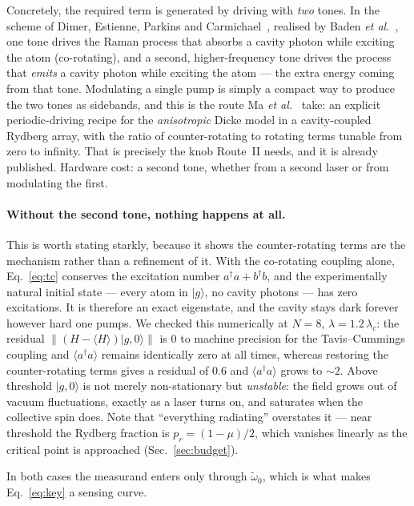 \documentclass[11pt,a4paper]{article}
\newcommand{\dg}{^{\dagger}}
\newcommand{\wt}{\tilde{\omega}_{0}}
\newcommand{\lc}{\lambda_{c}}
\newcommand{\ket}[1]{\lvert #1 \rangle}
\newcommand{\avg}[1]{\langle #1 \rangle}
\begin{document}
Concretely, the required term is generated by driving with \emph{two} tones. In the scheme of
Dimer, Estienne, Parkins and Carmichael~\cite{Dimer2007}, realised by Baden \emph{et
al.}~\cite{Baden2014}, one tone drives the Raman process that absorbs a cavity photon while
exciting the atom (co-rotating), and a second, higher-frequency tone drives the process that
\emph{emits} a cavity photon while exciting the atom --- the extra energy coming from that
tone. Modulating a single pump is simply a compact way to produce the two tones as sidebands,
and this is the route Ma \emph{et al.}~\cite{Anisotropic2025} take: an explicit
periodic-driving recipe for the \emph{anisotropic} Dicke model in a cavity-coupled Rydberg
array, with the ratio of counter-rotating to rotating terms tunable from zero to infinity.
That is precisely the knob Route~II needs, and it is already published. Hardware cost: a
second tone, whether from a second laser or from modulating the first.

\paragraph{Without the second tone, nothing happens at all.} This is worth stating starkly,
because it shows the counter-rotating terms are the mechanism rather than a refinement of it.
With the co-rotating coupling alone, Eq.~\eqref{eq:tc} conserves the excitation number
$a\dg a + b\dg b$, and the experimentally natural initial state --- every atom in $\ket{g}$,
no cavity photons --- has zero excitations. It is therefore an exact eigenstate, and the
cavity stays dark forever however hard one pumps. We checked this numerically at $N=8$,
$\lambda=1.2\,\lc$: the residual $\lVert(H-\langle H\rangle)\ket{g,0}\rVert$ is $0$ to machine
precision for the Tavis--Cummings coupling and $\avg{a\dg a}$ remains identically zero at all
times, whereas restoring the counter-rotating terms gives a residual of $0.6$ and
$\avg{a\dg a}$ grows to ${\sim}2$. Above threshold $\ket{g,0}$ is not merely non-stationary
but \emph{unstable}: the field grows out of vacuum fluctuations, exactly as a laser turns on,
and saturates when the collective spin does. Note that ``everything radiating'' overstates it
--- near threshold the Rydberg fraction is $p_r=(1-\mu)/2$, which vanishes linearly as the
critical point is approached (Sec.~\ref{sec:budget}).

In both cases the measurand enters only through $\wt$, which is what makes
Eq.~\eqref{eq:key} a sensing curve.
\end{document}
